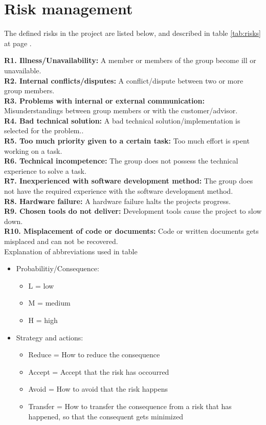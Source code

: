 

\section{Risk management}

The defined risks in the project are listed below, and described in table \ref{tab:risks} at page \pageref{tab:risks}.
\newline

\textbf{R1. Illness/Unavailability:} A member or members of the group become ill or unavailable. \\
\textbf{R2. Internal conflicts/disputes:} A conflict/dispute between two or more group members. \\
\textbf{R3. Problems with internal or external communication:} Misunderstandings between group members or with the customer/advisor. \\
\textbf{R4. Bad technical solution:} A bad technical solution/implementation is selected for the problem.. \\
\textbf{R5. Too much priority given to a certain task:} Too much effort is spent working on a task. \\
\textbf{R6. Technical incompetence:} The group does not possess the technical experience to solve a task. \\
\textbf{R7. Inexperienced with software development method:} The group does not have the required experience with the software development method. \\
\textbf{R8. Hardware failure:} A hardware failure halts the projects progress. \\
\textbf{R9. Chosen tools do not deliver:} Development tools cause the project to slow down. \\
\textbf{R10. Misplacement of code or documents:} Code or written documents gets misplaced and can not be recovered. \\

Explanation of abbreviations used in table%
\begin{itemize}
\item{}Probabilitiy/Consequence:
\begin{itemize}
\item{}L = low
\item{}M = medium
\item{}H = high
\end{itemize}
\item{}Strategy and actions:
\begin{itemize}
\item{}Reduce = How to reduce the consequence
\item{}Accept = Accept that the risk has occourred
\item{}Avoid = How to avoid that the risk happens
\item{}Transfer = How to transfer the consequence from a risk that has happened, so that the consequent gets minimized
\end{itemize}
\end{itemize}








